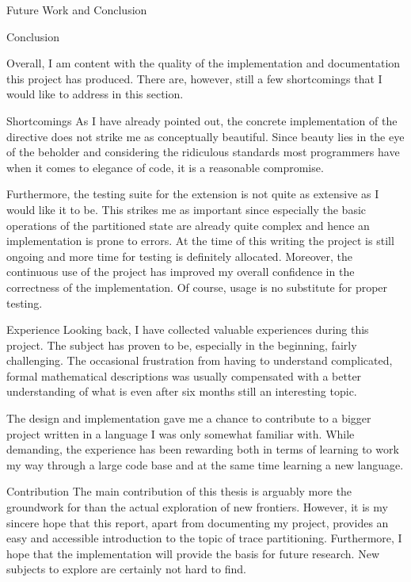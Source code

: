 \begin{chapter}{Future Work and Conclusion}
	\begin{section}{Conclusion}
		\label{section:Conclusion}

		Overall, I am content with the quality of the implementation and documentation this project has produced. There are, however, still a few shortcomings that I would like to address in this section. 
		

		\begin{subsection}{Shortcomings}
			As I have already pointed out, the concrete implementation of the  directive does not strike me as conceptually beautiful. Since beauty lies in the eye of the beholder and considering the ridiculous standards most programmers have when it comes to elegance of code, it is a reasonable compromise. 
			
			Furthermore, the testing suite for the extension is not quite as extensive as I would like it to be. This strikes me as important since especially the basic operations of the partitioned state are already quite complex and hence an implementation is prone to errors. At the time of this writing the project is still ongoing and more time for testing is definitely allocated. Moreover, the continuous use of the project has improved my overall confidence in the correctness of the implementation. Of course, usage is no substitute for proper testing.
		\end{subsection}


		\begin{subsection}{Experience}
			Looking back, I have collected valuable experiences during this project. The subject has proven to be, especially in the beginning, fairly challenging. The occasional frustration from having to understand complicated, formal mathematical descriptions was usually compensated with a better understanding of what is even after six months still an interesting topic. 

			The design and implementation gave me a chance to contribute to a bigger project written in a language I was only somewhat familiar with. While demanding, the experience has been rewarding both in terms of learning to work my way through a large code base and at the same time learning a new language.
		\end{subsection}


		\begin{subsection}{Contribution}
			The main contribution of this thesis is arguably more the groundwork for than the actual exploration of new frontiers. However, it is my sincere hope that this report, apart from documenting my project, provides an easy and accessible introduction to the topic of trace partitioning. Furthermore, I hope that the implementation will provide the basis for future research. New subjects to explore are certainly not hard to find.
		\end{subsection}
	\end{section}

\end{chapter}
